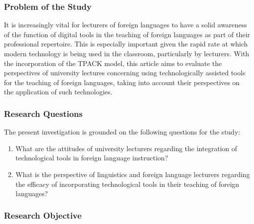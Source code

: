 \documentclass[english]{textolivre}
\begin{document}
\subsubsection{Problem of the Study}
    
    It is increasingly vital for lecturers of foreign languages to have a solid awareness of the function of digital tools in the teaching of foreign languages as part of their professional repertoire. This is especially important given the rapid rate at which modern technology is being used in the classroom, particularly by lecturers. With the incorporation of the TPACK model, this article aims to evaluate the perspectives of university lectures concerning using technologically assisted tools for the teaching of foreign languages, taking into account their perspectives on the application of such technologies.

\subsubsection{Research Questions}

    The present investigation is grounded on the following questions for the study:
    \begin{enumerate}[label={\arabic*.}]
    \item What are the attitudes of university lecturers regarding the integration of technological tools in foreign language instruction?
    \item What is the perspective of linguistics and foreign language lecturers regarding the efficacy of incorporating technological tools in their teaching of foreign languages?
    \end{enumerate}

\subsubsection{Research Objective}
\end{document}

